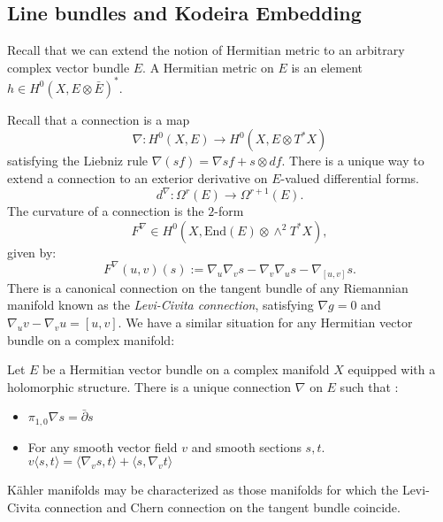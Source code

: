 \subsection{Line bundles and Kodeira Embedding}
Recall that we can extend the notion of Hermitian metric to an arbitrary complex vector bundle \(E\). A Hermitian metric on \(E\) is an element \(h \in H^0(X, E \otimes \bar{E})^* \).

Recall that a connection is a map
\[
\nabla: H^0(X,E) \to H^0(X,E \otimes T^* X)
\]
satisfying the Liebniz rule \(\nabla(s f) = \nabla s f + s \otimes df\). There is a unique way to extend a connection to an exterior derivative on \(E\)-valued differential forms.
\[
d^\nabla: \Omega^r(E) \to \Omega^{r+1}(E).
\]
The curvature of a connection is the \(2\)-form
\[
F^\nabla \in H^0(X, \text{End}(E) \otimes \wedge^2 T^* X),
\]
given by:
\[
F^\nabla(u,v)(s) := \nabla_u \nabla_v s - \nabla_v \nabla_u s - \nabla_{[u,v]} s.
\]
There is a canonical connection on the tangent bundle of any Riemannian manifold known as the \textit{Levi-Civita connection}, satisfying \(\nabla g = 0\) and \(\nabla_u v - \nabla_v u = [u,v]\). We have a similar situation for any Hermitian vector bundle on a complex manifold:	
\begin{example}
Let \(E\) be a Hermitian vector bundle on a complex manifold \(X\) equipped with a holomorphic structure. There is a unique connection \(\nabla\) on \(E\) such that :
\begin{itemize}
\item  \(\pi_{1,0} \nabla s = \bar{\partial} s\)
\item For any smooth vector field \(v\) and smooth sections \(s,t\). \(v \langle s,t \rangle = \langle \nabla_v s , t \rangle + \langle s, \nabla_v t \rangle\) 
\end{itemize}
\end{example}
K\"ahler manifolds may be characterized as those manifolds for which the Levi-Civita connection and Chern connection on the tangent bundle coincide.

